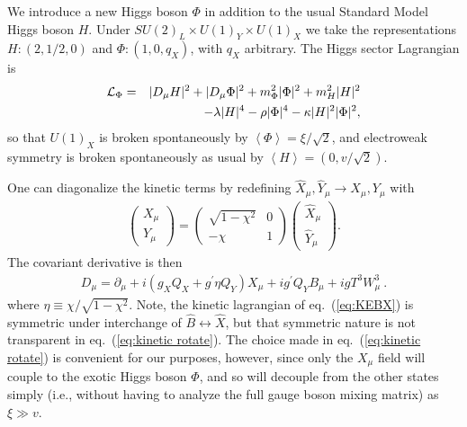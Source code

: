 \documentclass[12pt]{article}
\def\beq{\begin{eqnarray}}
\def\eeq{\end{eqnarray}}
\def\bea{\begin{eqnarray}}
\def\eea{\end{eqnarray}}
\def\eq#1{eq.~(\ref{#1})}
\begin{document}
We introduce a new Higgs boson $\Phi$ in addition to the usual Standard Model Higgs boson
$H$.
Under $SU(2)_L \times U(1)_Y \times U(1)_X$ we take the representations
$H: (2, 1/2, 0)$ and $\Phi: (1, 0, q_X)$, with $q_X$ arbitrary.
The Higgs sector Lagrangian is
\bea 
{\cal L}_{\Phi} &=& |D_\mu H|^2
+ |D_\mu \Phi |^2 %
 + m^2_{\Phi}|\Phi|^2 + m^2_{H}|H|^2 \nonumber\\
& & - \lambda|H|^4 - \rho|\Phi|^4 - \kappa
|H|^2|\Phi|^2, \label{Lphi.EQ} 
\eea
so that $U(1)_X$ is broken spontaneously by $\left< \Phi \right> = \xi/\sqrt{2}$,
and electroweak symmetry is broken spontaneously as usual by
$\left< H\right> = (0,v/\sqrt{2})$. 

One can diagonalize the kinetic terms by redefining $\hat{X}_\mu ,
\hat{Y}_\mu \rightarrow X_\mu , Y_\mu$ with
\beq
\left( \begin{array}{c} X_\mu \\ Y_\mu \end{array} \right) = \left(
\begin{array}{cc} \sqrt{1-\chi^2} & 0 \\ -\chi & 1 \end{array} \right)
\left( \begin{array}{c} \hat{X}_\mu \\ \hat{Y}_\mu \end{array}
\right). \label{eq:kinetic rotate}
\eeq
The covariant derivative is then\beq D_\mu =
\partial_\mu + i (g_X Q_X + g^\prime \eta Q_Y) X_\mu + i g^\prime
Q_Y B_\mu + i g T^3 W^3_\mu \  . \label{DMUGAU.EQ} \eeq
where $\eta \equiv \chi / \sqrt{1-\chi^2}$. Note, the kinetic lagrangian of \eq{eq:KEBX} is symmetric under interchange of $\hat B \leftrightarrow \hat X$, but that symmetric nature is not transparent in \eq{eq:kinetic rotate}. The choice made in \eq{eq:kinetic rotate} is convenient for our purposes, however, since only the $X_\mu$ field will couple to the exotic Higgs boson $\Phi$, and so will decouple from the other states simply (i.e., without having to analyze the full gauge boson mixing matrix) as $\xi\gg v$.
\end{document}
